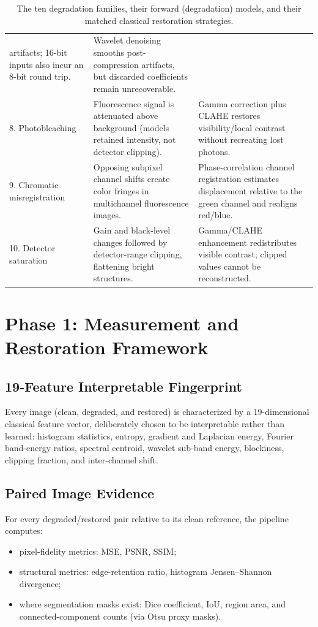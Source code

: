 \documentclass[11pt]{article}
\begin{document}
\begin{table}[h]
\begin{tabularx}{\linewidth}{@{}l X X@{}}
artifacts; 16-bit inputs also incur an 8-bit round trip. &
Wavelet denoising smooths post-compression artifacts, but discarded coefficients remain
unrecoverable. \\
8. Photobleaching &
Fluorescence signal is attenuated above background (models retained intensity, not
detector clipping). &
Gamma correction plus CLAHE restores visibility/local contrast without recreating lost
photons. \\
9. Chromatic misregistration &
Opposing subpixel channel shifts create color fringes in multichannel fluorescence
images. &
Phase-correlation channel registration estimates displacement relative to the green
channel and realigns red/blue. \\
10. Detector saturation &
Gain and black-level changes followed by detector-range clipping, flattening bright
structures. &
Gamma/CLAHE enhancement redistributes visible contrast; clipped values cannot be
reconstructed. \\
\bottomrule
\end{tabularx}
\caption{The ten degradation families, their forward (degradation) models, and their
matched classical restoration strategies.}
\label{tab:families}
\end{table}

\section{Phase 1: Measurement and Restoration Framework}

\subsection{19-Feature Interpretable Fingerprint}

Every image (clean, degraded, and restored) is characterized by a 19-dimensional
classical feature vector, deliberately chosen to be interpretable rather than learned:
histogram statistics, entropy, gradient and Laplacian energy, Fourier band-energy
ratios, spectral centroid, wavelet sub-band energy, blockiness, clipping fraction, and
inter-channel shift.

\subsection{Paired Image Evidence}

For every degraded/restored pair relative to its clean reference, the pipeline computes:
\begin{itemize}[leftmargin=1.4em]
    \item pixel-fidelity metrics: MSE, PSNR, SSIM;
    \item structural metrics: edge-retention ratio, histogram Jensen--Shannon
    divergence;
    \item where segmentation masks exist: Dice coefficient, IoU, region area, and
    connected-component counts (via Otsu proxy masks).
\end{itemize}
\end{document}
